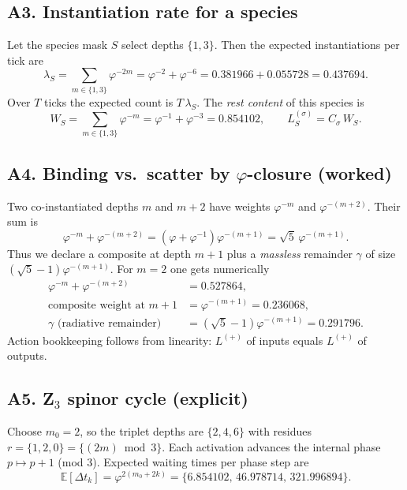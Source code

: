 \documentclass[11pt]{article}
\theoremstyle{remark}
\begin{document}
\subsection*{A3. Instantiation rate for a species}
Let the species mask $S$ select depths $\{1,3\}$. Then the expected instantiations per tick are
\begin{equation*}
\lambda_S=\sum_{m\in\{1,3\}}\varphi^{-2m}=\varphi^{-2}+\varphi^{-6}
= 0.381966+0.055728= 0.437694.
\end{equation*}
Over $T$ ticks the expected count is $T\,\lambda_S$. The \emph{rest content} of this species is
\begin{equation*}
W_S=\sum_{m\in\{1,3\}}\varphi^{-m}=\varphi^{-1}+\varphi^{-3}=0.854102,\qquad
L_S^{(\sigma)}=C_\sigma\,W_S.
\end{equation*}

\subsection*{A4. Binding vs.\ scatter by $\varphi$-closure (worked)} 
Two co-instantiated depths $m$ and $m\!+\!2$ have weights $\varphi^{-m}$ and $\varphi^{-(m+2)}$. Their sum is
\begin{equation*}
\varphi^{-m}+\varphi^{-(m+2)}=(\varphi+\varphi^{-1})\varphi^{-(m+1)}=\sqrt5\,\varphi^{-(m+1)}.
\end{equation*}
Thus we declare a composite at depth $m{+}1$ plus a \emph{massless} remainder $\gamma$ of size $(\sqrt5-1)\varphi^{-(m+1)}$.
For $m=2$ one gets numerically
\begin{align*}
\varphi^{-m}+\varphi^{-(m+2)}&=0.527864,\\
\text{composite weight at $m{+}1$}&=\varphi^{-(m+1)}=0.236068,\\
\gamma\text{ (radiative remainder)}&=(\sqrt5-1)\varphi^{-(m+1)}=0.291796.
\end{align*}
Action bookkeeping follows from linearity: $L^{(+)}$ of inputs equals $L^{(+)}$ of outputs.

\subsection*{A5. Z$_3$ spinor cycle (explicit)} 
Choose $m_0=2$, so the triplet depths are $\{2,4,6\}$ with residues
\(
r=\{1,2,0\}=\{(2m)\bmod3\}.
\)
Each activation advances the internal phase $p\mapsto p+1$ (mod 3). Expected waiting times per phase step are
\begin{equation*}
\mathbb E[\Delta t_k]=\varphi^{2(m_0+2k)}=\{6.854102,\,46.978714,\,321.996894\}.
\end{equation*}
\end{document}
